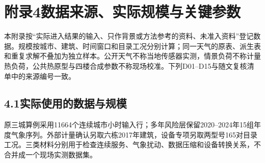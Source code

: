 \clearpage
\section*{附录4\quad 数据来源、实际规模与关键参数}
\label{appendix:data}

本附录按“实际进入结果的输入、只作背景或方法参考的资料、未准入资料”登记数据。规模按城市、建筑、时间窗口和目录工况分别计算；同一天气的原表、派生表和重复求解不叠加为独立样本。公开天气不称当地传感器实测，情景负荷不称计量热负荷，公共热原型与四楼合成参数不称现场校准。下列D01--D15与随文复核清单中的来源编号一致。

\subsection*{4.1\quad 实际使用的数据与规模}

原三城算例采用11664个连续城市小时输入行；多年风险层保留2020--2024年15组年度气象序列。外部计量确认另取六栋2017年建筑，设备专项另取两型号165对目录工况。三类材料分别用于检查连续服务、气象扰动、数据压缩和设备转换关系，不合并成一个现场实测数据集。

